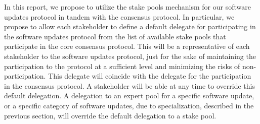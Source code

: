 In this report, we propose to utilize the stake pools mechanism for our software
updates protocol in tandem with the consensus protocol. In particular, we
propose to allow each stakeholder to define a default delegate for participating
in the software updates protocol from the list of available stake pools that
participate in the core consensus protocol. This will be a 
representative of each stakeholder to the software updates protocol, just for
the sake of maintaining the participation to the protocol at a sufficient level
and minimizing the risks of non-participation. This delegate will coincide with
the delegate for the participation in the consensus protocol. A stakeholder will
be able at any time to override this default delegation. A delegation to an
expert pool for a specific software update, or a specific category of software
updates, due to specialization, described in the previous section, will override
the default delegation to a stake pool.



